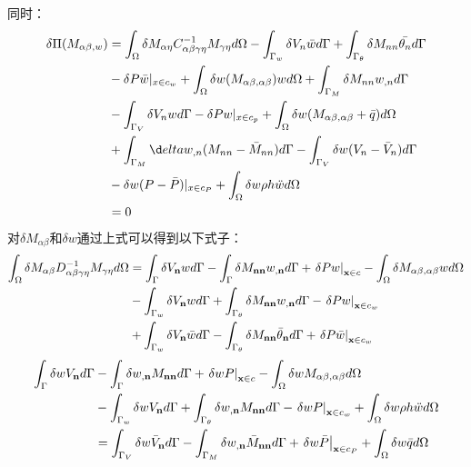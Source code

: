 \documentclass[11pt,a4paper]{article}
\begin{document}
    同时：
    \begin{equation}
    \begin{split}
        \delta\Pi(M_{\alpha\beta,w})&=\int_{\Omega}\delta M_{\alpha\eta}C^{-1}_{\alpha\beta\gamma\eta}M_{\gamma\eta}d\Omega-\int_{\Gamma_w}\delta V_n\bar{w}d\Gamma+\int_{\Gamma_{\theta}}\delta M_{nn}\bar{\theta_n}d\Gamma\\
        &-\delta P\bar{w}\vert_{x\in c_w}+\int_{\Omega}\delta w(M_{\alpha\beta,\alpha\beta})wd\Omega+\int_{\Gamma_M}\delta M_{nn}w_{,n}d\Gamma\\
        &-\int_{\Gamma_V}\delta V_nwd\Gamma-\delta Pw\vert_{x\in c_p}+\int_{\Omega}\delta w(M_{\alpha\beta,\alpha\beta}+\bar{q})d\Omega\\
        &+\int_{\Gamma_M}\d   elta w_{,n}(M_{nn}-\bar{M}_{nn})d\Gamma-\int_{\Gamma_V}\delta w(V_n-\bar{V}_n)d\Gamma\\
        &-\delta w(P-\bar{P})\vert_{x\in c_P}+\int_{\Omega}\delta w\rho h\ddot{w}d\Omega\\
        &=0
    \end{split}
    \end{equation}
对$\delta M_{\alpha\beta}$和$\delta w$通过上式可以得到以下式子：
\begin{equation}
    \begin{split}
    \int_\Omega ^{}{\delta {M_{\alpha \beta }}D_{\alpha \beta \gamma \eta }^{ - 1}{M_{\gamma \eta }}d\Omega }&=\int_\Gamma ^{} {\delta {V_{\bf{n}}}wd\Gamma }  - \int_\Gamma ^{} {\delta {M_{{\bf{nn}}}}{w_{,{\bf{n}}}}d\Gamma }+{\left. {\delta Pw} \right|_{{\bf{x}} \in c}} - \int_\Omega ^{} {\delta {M_{\alpha \beta ,\alpha \beta }}wd\Omega } \\
     &-\int_{{\Gamma _w}}^{} {\delta {V_{\bf{n}}}wd\Gamma }  + \int_{{\Gamma _\theta }}^{} {\delta {M_{{\bf{nn}}}}{w_{,{\bf{n}}}}d\Gamma }  - {\left. {\delta Pw} \right|_{{\bf{x}} \in {c_w}}}\\
    &+\int_{{\Gamma _w}}^{} {\delta {V_{\bf{n}}}\bar wd\Gamma }  - \int_{{\Gamma _\theta }}^{} {\delta {M_{{\bf{nn}}}}{{\bar \theta }_{\bf{n}}}d\Gamma }  + {\left. {\delta P\bar w} \right|_{{\bf{x}} \in {c_w}}}
    \end{split}
    \end{equation}
    \begin{equation}
        \begin{split}
        \int_\Gamma ^{} {\delta w{V_{\bf{n}}}d\Gamma }&- \int_\Gamma ^{} {\delta {w_{,{\bf{n}}}}{M_{{\bf{nn}}}}d\Gamma }  + {\left. {\delta wP} \right|_{{\bf{x}} \in c}} - \int_\Omega ^{} {\delta w{M_{\alpha \beta ,\alpha\beta}}d\Omega }\\
         &- \int_{{\Gamma _w}}^{} {\delta w{V_{\bf{n}}}d\Gamma }  + \int_{{\Gamma _\theta }}^{} {\delta {w_{,{\bf{n}}}}{M_{{\bf{nn}}}}d\Gamma }  - {\left. {\delta wP} \right|_{{\bf{x}} \in {c_w}}}+\int_{\Omega}\delta w\rho h\ddot{w}d\Omega\\
         &= \int_{{\Gamma _V}}^{} {\delta w{{\bar V}_{\bf{n}}}d\Gamma }  - \int_{{\Gamma _M}}^{} {\delta {w_{,{\bf{n}}}}{{\bar M}_{{\bf{nn}}}}d\Gamma }  + {\left. {\delta w\bar P} \right|_{{\bf{x}} \in {c_P}}} + \int_\Omega ^{} {\delta w\bar qd\Omega} 
    \end{split}
    \end{equation}
\end{document}
